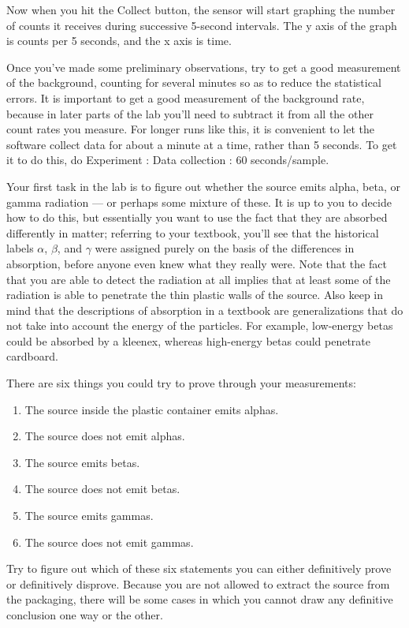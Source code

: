 Now when you hit the Collect button, the sensor will start graphing the number of counts
it receives during successive 5-second intervals. The y axis of the graph is counts
per 5 seconds, and the x axis is time.

Once you've made some preliminary observations, try to get a good measurement of
the background, counting for several minutes so as to reduce the statistical errors.
It is important to get a good measurement of the background rate, because in later
parts of the lab you'll need to subtract it from all the other count rates you measure.
For longer runs like this, it is convenient to let the software collect data for about a minute
at a time, rather than 5 seconds. To get it to do this, do Experiment : Data collection : 60 seconds/sample.


Your first task in the lab is to figure out whether the source emits
alpha, beta, or gamma radiation --- or perhaps some mixture of these.
It is up to you to decide how to do this, but essentially you want to
use the fact that they are absorbed differently in matter; referring
to your textbook, you'll see that the historical labels $\alpha$, $\beta$, and $\gamma$ were assigned
purely on the basis of the differences in absorption, before anyone even knew what they
really were. Note that the fact that you are able to detect the radiation
at all implies that at least some of the radiation is able to penetrate the thin
plastic walls of the source. Also keep in mind that the descriptions of absorption
in a textbook are generalizations that do not take into account the energy of the
particles. For example, low-energy betas could be absorbed by a kleenex, whereas
high-energy betas could penetrate cardboard.

There are six things you could try to prove through your measurements:
\begin{enumerate}
\item The source inside the plastic container emits alphas.
\item The source does not emit alphas.
\item The source emits betas.
\item The source does not emit betas.
\item The source emits gammas.
\item The source does not emit gammas.
\end{enumerate}

Try to figure out which of these six statements you can either definitively prove or
definitively disprove. Because you are not allowed to extract the source from the packaging,
there will be some cases in which you cannot draw any definitive conclusion one way or the other.

